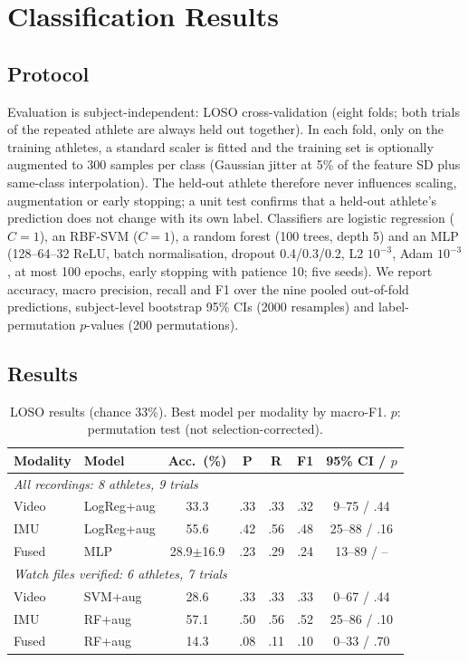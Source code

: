 \documentclass[conference]{IEEEtran}
\begin{document}
\section{Classification Results}\label{sec:results}
\subsection{Protocol}
Evaluation is subject-independent: LOSO cross-validation (eight folds; both trials of the repeated athlete are always held out together). In each fold, only on the training athletes, a standard scaler is fitted and the training set is optionally augmented to 300 samples per class (Gaussian jitter at 5\% of the feature SD plus same-class interpolation). The held-out athlete therefore never influences scaling, augmentation or early stopping; a unit test confirms that a held-out athlete's prediction does not change with its own label. Classifiers are logistic regression ($C=1$), an RBF-SVM ($C=1$), a random forest (100 trees, depth 5) and an MLP (128--64--32 ReLU, batch normalisation, dropout 0.4/0.3/0.2, L2 $10^{-3}$, Adam $10^{-3}$, at most 100 epochs, early stopping with patience 10; five seeds). We report accuracy, macro precision, recall and F1 over the nine pooled out-of-fold predictions, subject-level bootstrap 95\% CIs (2000 resamples) and label-permutation $p$-values (200 permutations).

\subsection{Results}
\begin{table}[t]
\caption{LOSO results (chance 33\%). Best model per modality by macro-F1. $p$: permutation test (not selection-corrected).}
\label{tab:res}
\centering\small
\setlength{\tabcolsep}{3pt}
\begin{tabular}{llccccc}
\toprule
Modality & Model & Acc.\ (\%) & P & R & F1 & 95\% CI / $p$ \\
\midrule
\multicolumn{7}{l}{\emph{All recordings: 8 athletes, 9 trials}}\\
Video & LogReg+aug & 33.3 & .33 & .33 & .32 & 9--75 / .44\\
IMU & LogReg+aug & 55.6 & .42 & .56 & .48 & 25--88 / .16\\
Fused & MLP & 28.9$\pm$16.9 & .23 & .29 & .24 & 13--89 / --\\
\multicolumn{7}{l}{\emph{Watch files verified: 6 athletes, 7 trials}}\\
Video & SVM+aug & 28.6 & .33 & .33 & .33 & 0--67 / .44\\
IMU & RF+aug & 57.1 & .50 & .56 & .52 & 25--86 / .10\\
Fused & RF+aug & 14.3 & .08 & .11 & .10 & 0--33 / .70\\
\bottomrule
\end{tabular}
\end{table}
\end{document}
